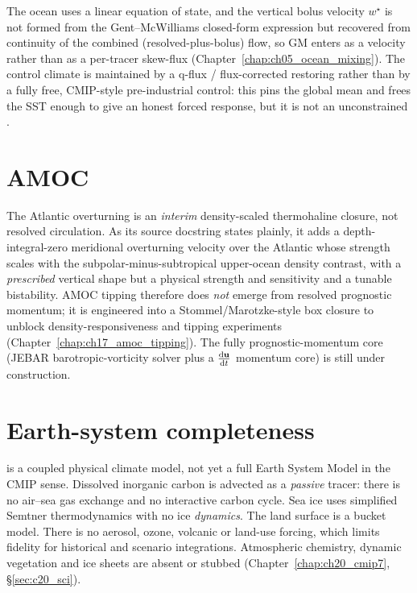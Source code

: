 The ocean uses a linear equation of state, and the vertical bolus velocity
$w^\star$ is not formed from the Gent--McWilliams closed-form expression but
recovered from continuity of the combined (resolved-plus-bolus) flow, so GM enters
as a velocity rather than as a per-tracer skew-flux
(Chapter~\ref{chap:ch05_ocean_mixing}). The control climate is maintained by a
q-flux / flux-corrected restoring rather than by a fully free, CMIP-style
pre-industrial control: this pins the global mean and frees the SST enough to give
an honest forced response, but it is not an unconstrained .

\section{AMOC}\label{sec:appE_amoc}

The Atlantic overturning is an \emph{interim} density-scaled thermohaline closure,
not resolved circulation. As its source docstring states plainly, it adds a
depth-integral-zero meridional overturning velocity over the Atlantic whose
strength scales with the subpolar-minus-subtropical upper-ocean density contrast,
with a \emph{prescribed} vertical shape but a physical strength and sensitivity and
a tunable bistability. AMOC tipping therefore does \emph{not} emerge from resolved
prognostic momentum; it is engineered into a Stommel/Marotzke-style box closure to
unblock density-responsiveness and tipping experiments
(Chapter~\ref{chap:ch17_amoc_tipping}). The fully prognostic-momentum core
(JEBAR barotropic-vorticity solver plus a $\frac{\mathrm{d}\mathbf{u}}{\mathrm{d}t}$ momentum core) is still
under construction.

\section{Earth-system completeness}\label{sec:appE_completeness}

\model{} is a coupled physical climate model, not yet a full Earth System Model in
the CMIP sense. Dissolved inorganic carbon is advected as a \emph{passive} tracer:
there is no air--sea gas exchange and no interactive carbon cycle. Sea ice uses
simplified Semtner thermodynamics with no ice \emph{dynamics}. The land surface is
a bucket model. There is no aerosol, ozone, volcanic or land-use forcing, which
limits fidelity for historical and scenario integrations. Atmospheric chemistry,
dynamic vegetation and ice sheets are absent or stubbed
(Chapter~\ref{chap:ch20_cmip7}, \S\ref{sec:c20_sci}).

